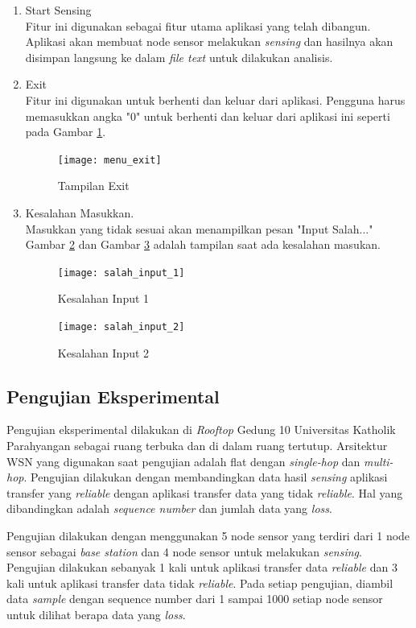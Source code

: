 \begin{enumerate}
    \item Start Sensing\\
    Fitur ini digunakan sebagai fitur utama aplikasi yang telah dibangun. Aplikasi akan membuat node sensor melakukan \textit{sensing} dan hasilnya akan disimpan langsung ke dalam \textit{file text} untuk dilakukan analisis. 
    \item Exit\\
    Fitur ini digunakan untuk berhenti dan keluar dari aplikasi. Pengguna harus memasukkan angka "0" untuk berhenti dan keluar dari aplikasi ini seperti pada Gambar \ref{fig:menu_exit}.
    \begin{figure}[H]
    	\centering
    	\texttt{[image: menu\_exit]}
    	\caption{Tampilan Exit}
    	\label{fig:menu_exit}
    \end{figure}
    \item Kesalahan Masukkan.\\
    Masukkan yang tidak sesuai akan menampilkan pesan "Input Salah..." Gambar \ref{fig:salah_input_1} dan Gambar \ref{fig:salah_input_2} adalah tampilan saat ada kesalahan masukan.
    \begin{figure}[H]
    	\centering
    	\texttt{[image: salah\_input\_1]}
    	\caption{Kesalahan Input 1}
    	\label{fig:salah_input_1}
    \end{figure}
    \begin{figure}[H]
    	\centering
    	\texttt{[image: salah\_input\_2]}
    	\caption{Kesalahan Input 2}
    	\label{fig:salah_input_2}
    \end{figure}
\end{enumerate}

\subsection{Pengujian Eksperimental}
Pengujian eksperimental dilakukan di \textit{Rooftop} Gedung 10 Universitas Katholik Parahyangan sebagai ruang terbuka dan di dalam ruang tertutup. Arsitektur WSN yang digunakan saat pengujian adalah flat dengan \textit{single-hop} dan \textit{multi-hop}. Pengujian dilakukan dengan membandingkan data hasil \textit{sensing} aplikasi transfer yang \textit{reliable} dengan aplikasi transfer data yang tidak \textit{reliable}. Hal yang dibandingkan adalah \textit{sequence number} dan jumlah data yang \textit{loss}. 

Pengujian dilakukan dengan menggunakan 5 node sensor yang terdiri dari 1 node sensor sebagai \textit{base station} dan 4 node sensor untuk melakukan \textit{sensing}. Pengujian dilakukan sebanyak 1 kali untuk aplikasi transfer data \textit{reliable} dan 3 kali untuk aplikasi transfer data tidak \textit{reliable}. Pada setiap pengujian, diambil data \textit{sample} dengan sequence number dari 1 sampai 1000 setiap node sensor untuk dilihat berapa data yang \textit{loss}. 


